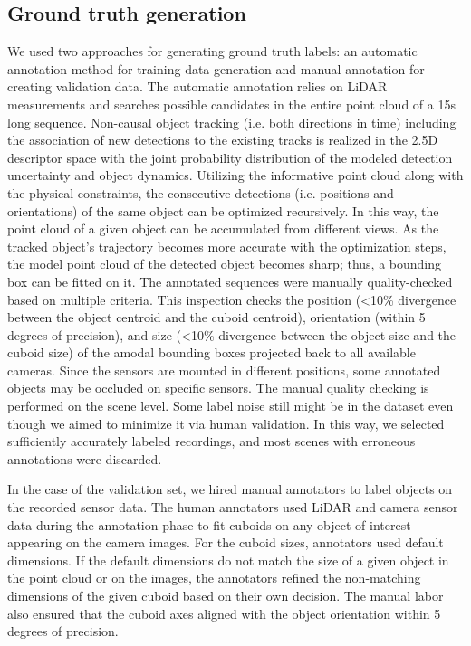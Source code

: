 \documentclass{article}
\begin{document}
\subsection{Ground truth generation}
\label{gt}
We used two approaches for generating ground truth labels: an automatic annotation method for training data generation and manual annotation for creating validation data. The automatic annotation relies on LiDAR measurements and searches possible candidates in the entire point cloud of a 15s long sequence. Non-causal object tracking (i.e. both directions in time) including the association of new detections to the existing tracks is realized in the 2.5D descriptor space with the joint probability distribution of the modeled detection uncertainty and object dynamics. Utilizing the informative point cloud along with the physical constraints, the consecutive detections (i.e. positions and orientations) of the same object can be optimized recursively. In this way, the point cloud of a given object can be accumulated from different views. As the tracked object's trajectory becomes more accurate with the optimization steps, the model point cloud of the detected object becomes sharp; thus, a bounding box can be fitted on it. The annotated sequences were manually quality-checked based on multiple criteria. This inspection checks the position (<10\% divergence between the object centroid and the cuboid centroid), orientation (within 5 degrees of precision), and size (<10\% divergence between the object size and the cuboid size) of the amodal bounding boxes projected back to all available cameras. Since the sensors are mounted in different positions, some annotated objects may be occluded on specific sensors. The manual quality checking is performed on the scene level. Some label noise still might be in the dataset even though we aimed to minimize it via human validation. In this way, we selected sufficiently accurately labeled recordings, and most scenes with erroneous annotations were discarded. 

In the case of the validation set, we hired manual annotators to label objects on the recorded sensor data. The human annotators used LiDAR and camera sensor data during the annotation phase to fit cuboids on any object of interest appearing on the camera images. For the cuboid sizes, annotators used default dimensions. If the default dimensions do not match the size of a given object in the point cloud or on the images, the annotators refined the non-matching dimensions of the given cuboid based on their own decision. The manual labor also ensured that the cuboid axes aligned with the object orientation within 5 degrees of precision.
\end{document}
